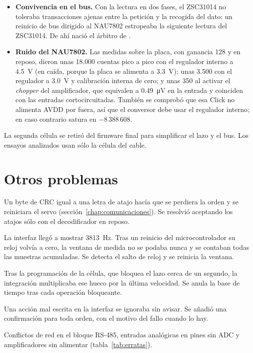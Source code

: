 \begin{itemize}
  \item \textbf{Convivencia en el bus.} Con la lectura en dos fases, el ZSC31014 no toleraba
        transacciones ajenas entre la petición y la recogida del dato: un reinicio de bus dirigido al
        NAU7802 estropeaba la siguiente lectura del ZSC31014. De ahí nació el árbitro de
        .
  \item \textbf{Ruido del NAU7802.} Las medidas sobre la placa, con ganancia 128 y en reposo, dieron
        unas 18.000 cuentas pico a pico con el regulador interno a \SI{4.5}{\volt} (en caída, porque la
        placa se alimenta a \SI{3.3}{\volt}); unas 3.500 con el regulador a \SI{3.0}{\volt} y
        calibración interna de cero; y unas 350 al activar el \emph{chopper} del amplificador, que
        equivalen a \SI{0.49}{\micro\volt} en la entrada y coinciden con las entradas cortocircuitadas.
        También se comprobó que esa Click no alimenta AVDD por fuera, así que el conversor debe usar el
        regulador interno; en caso contrario satura en $-8\,388\,608$.
\end{itemize}

La segunda célula se retiró del firmware final para simplificar el lazo y el bus. Los ensayos
analizados usan sólo la célula del cable.

\section{Otros problemas}

\begin{description}[style=nextline,leftmargin=1.5em]
  \item[Órdenes perdidas por los atajos de teclado] Un byte de CRC igual a una letra de atajo hacía que
        se perdiera la orden y se reiniciara el servo (sección~\ref{chap:comunicaciones}). Se resolvió
        aceptando los atajos sólo con el decodificador en reposo.
  \item[Frecuencia de muestreo imposible] La interfaz llegó a mostrar \SI{3813}{\hertz}. Tras un reinicio
        del microcontrolador su reloj volvía a cero, la ventana de medida no se podaba nunca y se
        contaban todas las muestras acumuladas. Se detecta el salto de reloj y se reinicia la ventana.
  \item[Desplazamientos fantasma] Tras la programación de la célula, que bloquea el lazo cerca de un
        segundo, la integración multiplicaba ese hueco por la última velocidad. Se anula la base de
        tiempo tras cada operación bloqueante.
  \item[Órdenes que ``no hacían nada''] Una acción mal escrita en la interfaz se ignoraba sin avisar. Se
        añadió una confirmación para toda orden, con el motivo del fallo cuando lo hay.
  \item[Revisión A de la placa] Conflictos de red en el bloque RS-485, entradas analógicas en pines sin
        ADC y amplificadores sin alimentar (tabla~\ref{tab:erratas}).
\end{description}


